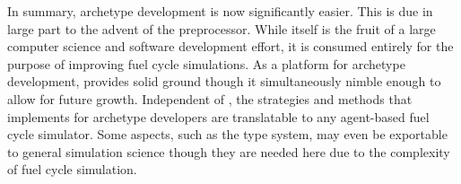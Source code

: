 In summary, archetype development is now significantly easier. This is due in large
part to the advent of the \cyclus preprocessor. While \cycpp itself is the fruit of
a large computer science and software development effort, it is consumed entirely 
for the purpose of improving fuel cycle simulations. As a platform for archetype
development, \cyclus provides solid ground though it simultaneously nimble enough
to allow for future growth. Independent of \cyclus, the strategies and methods that
\cyclus implements for archetype developers are translatable to any agent-based 
fuel cycle simulator.  Some aspects, such as the type system,  may even be exportable 
to general simulation science though they are needed here due to the complexity of 
fuel cycle simulation.

